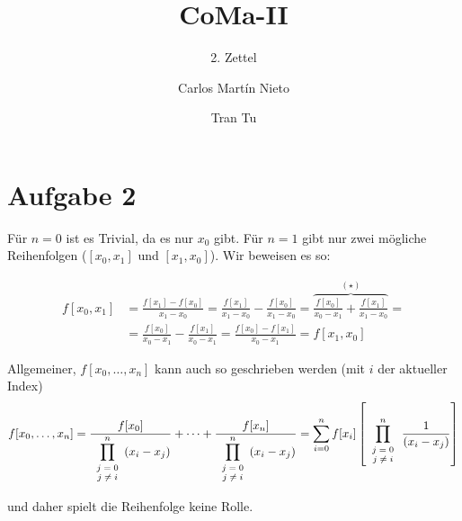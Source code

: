 \documentclass[a4paper,ngerman]{scrartcl}
\begin{document}
\title{CoMa-II}
\subtitle{2. Zettel}
\author{Carlos Martín Nieto \and Tran Tu}
\maketitle

\section*{Aufgabe 2}

Für $n=0$ ist es Trivial, da es nur $x_0$ gibt. Für $n=1$ gibt nur
zwei mögliche Reihenfolgen ($[x_0,x_1]$ und $[x_1,x_0]$). Wir beweisen
es so:

\begin{align*}
  f[x_0,x_1] &= \frac{f[x_1] - f[x_0]}{x_1-x_0} =
  \frac{f[x_1]}{x_1-x_0}-\frac{f[x_0]}{x_1-x_0} = 
  \overbrace{\frac{f[x_0]}{x_0-x_1} + \frac{f[x_1]}{x_1-x_0}}^{(\star)}=\\
  &= \frac{f[x_0]}{x_0-x_1} - \frac{f[x_1]}{x_0-x_1} =\frac{f[x_0] - f[x_1]}{x_0-x_1} = f[x_1,x_0]
\end{align*}

Allgemeiner, $f[x_0,\dots,x_n]$ kann auch so geschrieben werden (mit $i$ der aktueller Index)
\[
f[x_0,\dots,x_n] = \frac{f[x_0]}{\displaystyle\prod^{n}_{\scriptsize{
    \begin{array}{cc}
      j=0\\j\neq i
    \end{array}
}} (x_i-x_j)} + \dots +
\frac{f[x_n]}{\displaystyle\prod^{n}_{\scriptsize{
    \begin{array}{cc}
      j=0\\j\neq i
    \end{array}
}} (x_i-x_j)} =
\sum^n_{i=0} f[x_i]\left[ \prod^n_{\scriptsize{
    \begin{array}{cc}
      j=0\\j\neq i
    \end{array}
}}\frac{1}{(x_i-x_j)}\right]
\]

und daher spielt die Reihenfolge keine Rolle.
\end{document}
